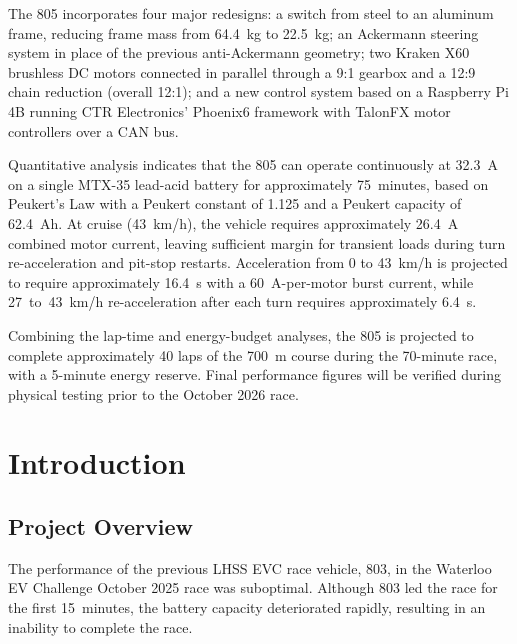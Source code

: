 \documentclass[12pt]{article}
\begin{document}
The 805 incorporates four major redesigns: a switch from steel to an aluminum
frame, reducing frame mass from 64.4~kg to 22.5~kg; an Ackermann steering
system in place of the previous anti-Ackermann geometry; two Kraken X60
brushless DC motors connected in parallel through a 9:1 gearbox and a 12:9
chain reduction (overall 12:1); and a new control system based on a
Raspberry Pi 4B running CTR Electronics' Phoenix6 framework with TalonFX
motor controllers over a CAN bus.

Quantitative analysis indicates that the 805 can operate continuously at
32.3~A on a single MTX-35 lead-acid battery for approximately 75~minutes,
based on Peukert's Law with a Peukert constant of 1.125 and a Peukert
capacity of 62.4~Ah. At cruise (43~km/h), the vehicle requires approximately
26.4~A combined motor current, leaving sufficient margin for transient loads
during turn re-acceleration and pit-stop restarts. Acceleration from 0 to
43~km/h is projected to require approximately 16.4~s with a 60~A-per-motor
burst current, while 27~to~43~km/h re-acceleration after each turn requires
approximately 6.4~s.

Combining the lap-time and energy-budget analyses, the 805 is projected to
complete approximately 40 laps of the 700~m course during the 70-minute
race, with a 5-minute energy reserve. Final performance figures will be
verified during physical testing prior to the October 2026 race.

\newpage

\tableofcontents
\newpage
\listoffigures
\newpage

\setcounter{page}{1}

\section{Introduction}

\subsection{Project Overview}
The performance of the previous LHSS EVC race vehicle, 803, in the Waterloo
EV Challenge October 2025 race was suboptimal. Although 803 led the race for
the first 15~minutes, the battery capacity deteriorated rapidly, resulting
in an inability to complete the race.
\end{document}
